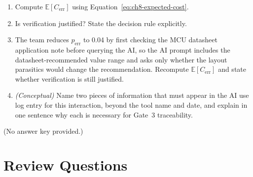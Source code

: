\begin{enumerate}
  \item[(a)] Compute $\mathbb{E}[C_{\text{err}}]$ using
             Equation~\ref{eq:ch8-expected-cost}.
  \item[(b)] Is verification justified? State the decision rule explicitly.
  \item[(c)] The team reduces $p_{\text{err}}$ to 0.04 by first checking the
             MCU datasheet application note before querying the AI, so the AI
             prompt includes the datasheet-recommended value range and asks
             only whether the layout parasitics would change the recommendation.
             Recompute $\mathbb{E}[C_{\text{err}}]$ and state whether
             verification is still justified.
  \item[(d)] \textit{(Conceptual)} Name two pieces of information that must
             appear in the AI use log entry for this interaction, beyond the
             tool name and date, and explain in one sentence why each is
             necessary for Gate~3 traceability.
\end{enumerate}

\noindent(No answer key provided.)

\section*{Review Questions}

